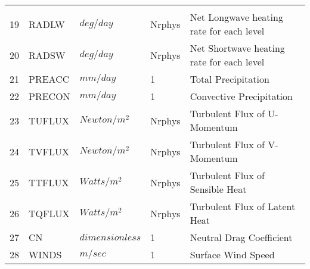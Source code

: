 \begin{tabular}{lllll}
\begin{minipage}[t]{3in}
         \end{minipage}\\
19 & RADLW    &  $deg/day$ &  Nrphys 
         &\begin{minipage}[t]{3in}
          {Net Longwave heating rate for each level}
         \end{minipage}\\
20 & RADSW    &  $deg/day$ &  Nrphys 
         &\begin{minipage}[t]{3in}
          {Net Shortwave heating rate for each level}
         \end{minipage}\\
21 & PREACC   &  $mm/day$ &  1
         &\begin{minipage}[t]{3in}
          {Total Precipitation}
         \end{minipage}\\
22 & PRECON   &  $mm/day$ &  1
         &\begin{minipage}[t]{3in}
          {Convective Precipitation}
         \end{minipage}\\
23 & TUFLUX   &  $Newton/m^2$ &  Nrphys
         &\begin{minipage}[t]{3in}
          {Turbulent Flux of U-Momentum}
         \end{minipage}\\
24 & TVFLUX   &  $Newton/m^2$ &  Nrphys
         &\begin{minipage}[t]{3in}
          {Turbulent Flux of V-Momentum}
         \end{minipage}\\
25 & TTFLUX   &  $Watts/m^2$ &  Nrphys
         &\begin{minipage}[t]{3in}
          {Turbulent Flux of Sensible Heat}
         \end{minipage}\\
26 & TQFLUX   &  $Watts/m^2$ &  Nrphys
         &\begin{minipage}[t]{3in}
          {Turbulent Flux of Latent Heat}
         \end{minipage}\\
27 & CN       &  $dimensionless$ &  1
         &\begin{minipage}[t]{3in}
          {Neutral Drag Coefficient}
         \end{minipage}\\
28 & WINDS     &  $m/sec$ &  1
         &\begin{minipage}[t]{3in}
          {Surface Wind Speed}
         \end{minipage}\\

\end{tabular}
